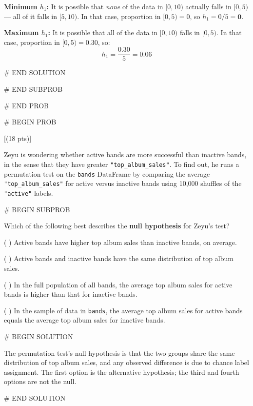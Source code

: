 \documentclass[twoside,12pt]{article}
\begin{document}
{\smallskip
\textbf{Minimum $h_1$:} It is possible that \textit{none} of the data in $[0, 10)$ actually falls in $[0, 5)$ --- all of it falls in $[5, 10)$. In that case, proportion in $[0, 5) = 0$, so $h_1 = 0/5 = \mathbf{0}$.

\smallskip
\textbf{Maximum $h_1$:} It is possible that all of the data in $[0, 10)$ falls in $[0, 5)$. In that case, proportion in $[0, 5) = 0.30$, so:
$$h_1 = \frac{0.30}{5} = 0.06$$


# END SOLUTION



# END SUBPROB





# END PROB

\newpage

# BEGIN PROB

[(18 pts)]

Zeyu is wondering whether active bands are more successful than inactive bands, in the sense that they have greater \texttt{"top\_album\_sales"}. To find out, he runs a permutation test on the \texttt{bands} DataFrame by comparing the average \texttt{"top\_album\_sales"} for active versus inactive bands using 10,000 shuffles of the \texttt{"active"} labels.



# BEGIN SUBPROB


Which of the following best describes the \textbf{null hypothesis} for Zeyu's test?

\smallskip
( ) Active bands have higher top album sales than inactive bands, on average.

\smallskip
( ) Active bands and inactive bands have the same distribution of top album sales.

\smallskip
( ) In the full population of all bands, the average top album sales for active bands is \gap higher than that for inactive bands.

\smallskip
( ) In the sample of data in \texttt{bands}, the average top album sales for active bands equals \gap the average top album sales for inactive bands.

# BEGIN SOLUTION


The permutation test's null hypothesis is that the two groups share the same distribution of top album sales, and any observed difference is due to chance label assignment. The first option is the alternative hypothesis; the third and fourth options are not the null.


# END SOLUTION



}
\end{document}

